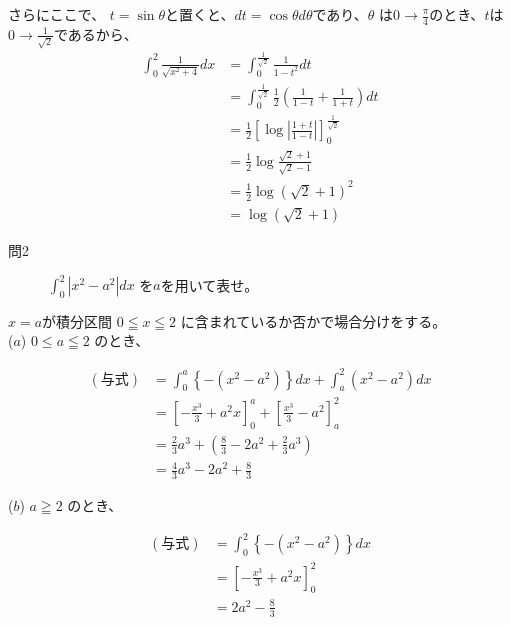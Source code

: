 \documentclass[dvipdfmx,uplatex]{jsarticle}
\begin{document}
さらにここで、
$t = \sin\theta$と置くと、$dt = \cos\theta d\theta$であり、$ \theta $ は$ \displaystyle 0 \rightarrow \frac{\pi}{4}$のとき、$t$は$\displaystyle 0 \rightarrow \frac{1}{\sqrt{2}}$であるから、\\

\begin{align*}
    \int_0^2 \frac{1}{\sqrt{x^2 + 4}} dx &= \int_0^\frac{1}{\sqrt{2}} \frac{1}{1 - t^2} dt \\
    &= \int_0^\frac{1}{\sqrt{2}} \frac{1}{2}\left(\frac{1}{1 - t} + \frac{1}{1 + t}\right) dt \\
    &= \frac{1}{2} \left[\log\left| \frac{1 + t}{1 - t} \right|\right]_0^\frac{1}{\sqrt{2}} \\
    &= \frac{1}{2}\log\frac{\sqrt{2}+ 1}{\sqrt{2} - 1} \\
    &= \frac{1}{2}\log(\sqrt{2} + 1)^2 \\
    &= \log(\sqrt{2} + 1)
\end{align*}

\newpage

\begin{description}
    \item [問2] $\displaystyle \int_0^2 \left|x^2 - a^2\right| dx$ を$a$を用いて表せ。\\
\end{description}

$x = a$が積分区間 $0 \leqq x \leqq 2$ に含まれているか否かで場合分けをする。\\
($a$) $0 \leq a\leqq 2$ のとき、

\begin{align*}
    (与式) &= \int_0^a \left\{ - (x ^ 2 - a ^ 2)\right\} dx + \int_a^2 (x^2 - a^2) dx \\
    &= \left[-\frac{x^3}{3} + a^2x\right]_0^a + \left[\frac{x^3}{3} - a^2\right]_a^2 \\
    &= \frac{2}{3}a^3 + \left(\frac{8}{3} - 2a^2 + \frac{2}{3}a ^ 3\right) \\
    &= \frac{4}{3}a^3 - 2a^2 + \frac{8}{3}
\end{align*}

($b$)  $a \geqq 2$ のとき、

\begin{align*}
    (与式) &= \int_0^2 \left\{- (x^2 - a^2)\right\} dx \\
    &= \left[ - \frac{x^3}{3} + a^2x\right]_0^2 \\
    &= 2a^2 - \frac{8}{3}
\end{align*}
\end{document}
